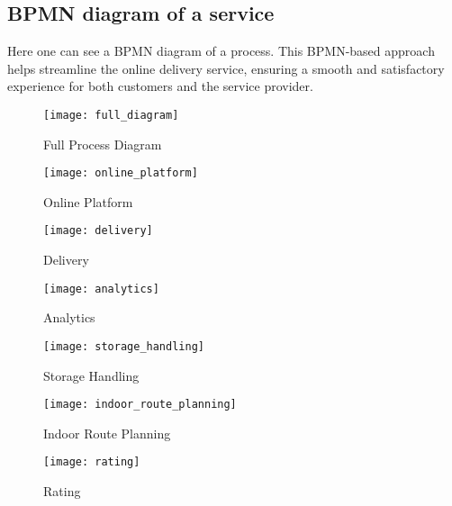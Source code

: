 \subsection{BPMN diagram of a service}

% 	

Here one can see a BPMN diagram of a process.
This BPMN-based approach helps streamline the online delivery service,
ensuring a smooth and satisfactory experience for both customers and the service provider.

\begin{figure}[H]
	\centering
	\texttt{[image: full\_diagram]}
	\caption{Full Process Diagram}
	\label{fig:full_process_diagram}
\end{figure}

\begin{figure}[ht!]
	\centering
	\texttt{[image: online\_platform]}
	\caption{Online Platform}
	\label{fig:online_platform}
\end{figure}

\begin{figure}[ht!]
	\centering
	\texttt{[image: delivery]}
	\caption{Delivery}
	\label{fig:delivery}
\end{figure}

\begin{figure}[ht!]
	\centering
	\texttt{[image: analytics]}
	\caption{Analytics}
	\label{fig:analytics}
\end{figure}

\begin{figure}[H]
	\centering
	\texttt{[image: storage\_handling]}
	\caption{Storage Handling}
	\label{fig:storage_handling}
\end{figure}

\begin{figure}[H]
	\centering
	\texttt{[image: indoor\_route\_planning]}
	\caption{Indoor Route Planning}
	\label{fig:indoor_route_planning}
\end{figure}

\begin{figure}[H]
	\centering
	\texttt{[image: rating]}
	\caption{Rating}
	\label{fig:rating}
\end{figure}

